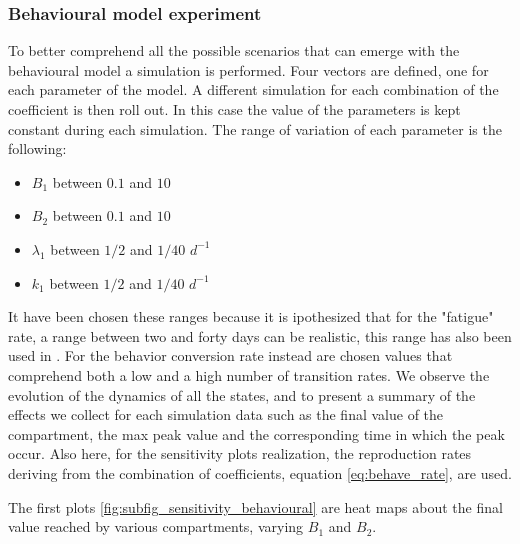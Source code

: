 \subsubsection{Behavioural model experiment}
To better comprehend all the possible scenarios that can emerge with the behavioural model a simulation is performed. Four vectors are defined, one for each parameter of the model. A different simulation for each combination of the coefficient is then roll out. In this case the value of the parameters is kept constant during each simulation.
The range of variation of each parameter is the following:
\begin{itemize}
	\item $B_1$ between $0.1$ and $10$
	\item $B_2$ between $0.1$ and $10$
	\item $\lambda_1$ between $1/2$ and $1/40$ $d^{-1}$
	\item $k_1$ between $1/2$ and $1/40$ $d^{-1}$
\end{itemize}
It have been chosen these ranges because it is ipothesized that for the "fatigue" rate, a range between two and forty days can be realistic, this range has also been used in \cite{trova e cita world in data}. For the behavior conversion rate instead are chosen values that comprehend both a low and a high number of transition rates.  
We observe the evolution of the dynamics of all the states, and to present a summary of the effects we collect for each simulation data such as the final value of the compartment, the max peak value and the corresponding time in which the peak occur. 
Also here, for the sensitivity plots realization, the reproduction rates deriving from the combination of coefficients, equation \eqref{eq:behave_rate}, are used. 

The first plots \ref{fig:subfig_sensitivity_behavioural} are heat maps about the final value reached by various compartments, varying $B_1$ and $B_2$.

